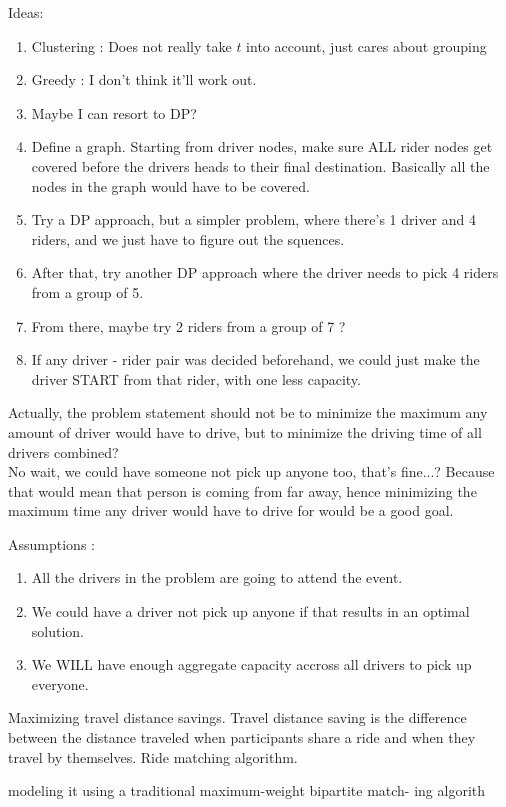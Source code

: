 \documentclass[12pt, oneside]{article}
\begin{document}
Ideas: 
\begin{enumerate}
  \item Clustering : Does not really take $t$ into account, just cares about grouping
  \item Greedy : I don't think it'll work out. 
  \item Maybe I can resort to DP? 
  \item Define a graph. Starting from driver nodes, make sure ALL rider nodes get covered before the drivers heads to their final destination. Basically all the nodes in the graph would have to be covered. 
  \item Try a DP approach, but a simpler problem, where there's 1 driver and 4 riders, and we just have to figure out the squences. 
  \item After that, try another DP approach where the driver needs to pick 4 riders from a group of 5. 
  \item From there, maybe try 2 riders from a group of 7 ? 
  \item If any driver - rider pair was decided beforehand, we could just make the driver START from that rider, with one less capacity. 
\end{enumerate}

Actually, the problem statement should not be to minimize the maximum any amount of driver would have to drive, but to minimize the driving time of all drivers combined? \\ 
No wait, we could have someone not pick up anyone too, that's fine...? Because that would mean that person is coming from far away, hence minimizing the maximum time any driver would have to drive for would be a good goal. 

Assumptions : 
\begin{enumerate}
  \item All the drivers in the problem are going to attend the event. 
  \item We could have a driver not pick up anyone if that results in an optimal solution. 
  \item We WILL have enough aggregate capacity accross all drivers to pick up everyone. 

\end{enumerate}

Maximizing travel distance savings. Travel distance saving is the difference between the distance traveled when participants share a ride and when they travel by themselves. 
Ride matching algorithm.

modeling it using a traditional maximum-weight bipartite match- ing algorith
\end{document}
